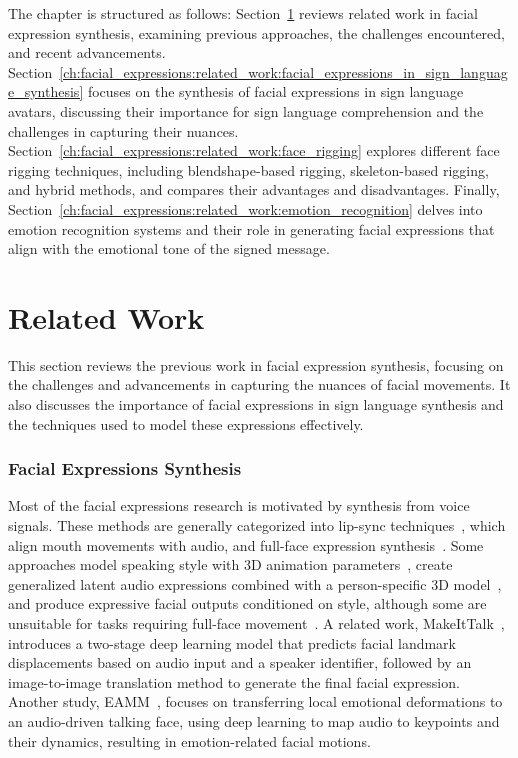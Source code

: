 \documentclass[../../main]{subfiles}
\begin{document}
The chapter is structured as follows: Section~\ref{ch:facial_expressions:related_work} reviews related work in facial expression synthesis, examining previous approaches, the challenges encountered, and recent advancements. Section~\ref{ch:facial_expressions:related_work:facial_expressions_in_sign_language_synthesis} focuses on the synthesis of facial expressions in sign language avatars, discussing their importance for sign language comprehension and the challenges in capturing their nuances. Section~\ref{ch:facial_expressions:related_work:face_rigging} explores different face rigging techniques, including blendshape-based rigging, skeleton-based rigging, and hybrid methods, and compares their advantages and disadvantages. Finally, Section~\ref{ch:facial_expressions:related_work:emotion_recognition} delves into emotion recognition systems and their role in generating facial expressions that align with the emotional tone of the signed message.

\section{Related Work}
\label{ch:facial_expressions:related_work}

This section reviews the previous work in facial expression synthesis, focusing on the challenges and advancements in capturing the nuances of facial movements. It also discusses the importance of facial expressions in sign language synthesis and the techniques used to model these expressions effectively.

\subsubsection{Facial Expressions Synthesis}
\label{ch:facial_expressions:related_work:facial_expressions_synthesis}

Most of the facial expressions research is motivated by synthesis from voice signals. These methods are generally categorized into lip-sync techniques~\cite{yousaidthat, talkingface, lipmovements, lipsyncexpert}, which align mouth movements with audio, and full-face expression synthesis~\cite{eskimez, greenwood18, controllable_facial_synth}. Some approaches model speaking style with 3D animation parameters~\cite{cudeiro}, create generalized latent audio expressions combined with a person-specific 3D model~\cite{FLAME}, and produce expressive facial outputs conditioned on style, although some are unsuitable for tasks requiring full-face movement~\cite{imitating}. A related work, MakeItTalk~\cite{Yang:2020:MakeItTalk}, introduces a two-stage deep learning model that predicts facial landmark displacements based on audio input and a speaker identifier, followed by an image-to-image translation method to generate the final facial expression. Another study, EAMM~\cite{eamm}, focuses on transferring local emotional deformations to an audio-driven talking face, using deep learning to map audio to keypoints and their dynamics, resulting in emotion-related facial motions.
\end{document}
